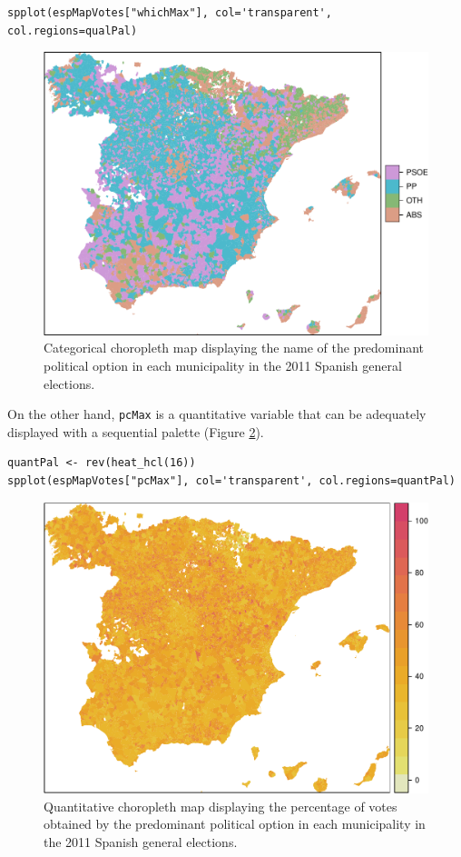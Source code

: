 \lstset{language=R,numbers=none}
\begin{lstlisting}
spplot(espMapVotes["whichMax"], col='transparent', col.regions=qualPal)
\end{lstlisting}

\begin{figure}[htb]
\centering
\includegraphics[width=.9\linewidth]{figs/whichMax.pdf}
\caption{\label{fig:whichMax}Categorical choropleth map displaying the name of the predominant political option in each municipality in the 2011 Spanish general elections.}
\end{figure}

On the other hand, \texttt{pcMax} is a quantitative variable that can be
adequately displayed with a sequential palette (Figure \ref{fig:pcMax}).
\lstset{language=R,numbers=none}
\begin{lstlisting}
quantPal <- rev(heat_hcl(16))
spplot(espMapVotes["pcMax"], col='transparent', col.regions=quantPal)
\end{lstlisting}

\begin{figure}[htb]
\centering
\includegraphics[width=.9\linewidth]{figs/pcMax.pdf}
\caption{\label{fig:pcMax}Quantitative choropleth map displaying the percentage of votes obtained by the predominant political option in each municipality in the 2011 Spanish general elections.}
\end{figure}
